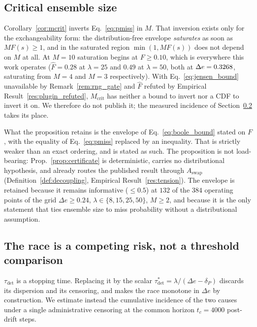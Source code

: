 \subsection{Critical ensemble size}\label{sec:dep_mcrit}

\begin{remark}\label{rem:mcrit_withdrawn}
  Corollary~\ref{cor:mcrit} inverts Eq.~\eqref{eq:pmiss} in $M$. That inversion exists only for the
  exchangeability form: the distribution-free envelope \emph{saturates} as soon as $M F(s) \ge 1$,
  and in the saturated region $\min(1, M F(s))$ does not depend on $M$ at all. At $M = 10$
  saturation begins at $F \ge 0.10$, which is everywhere this work operates
  ($\widehat{F} = 0.28$ at $\lambda = 25$ and $0.49$ at $\lambda = 50$, both at
  $\Delta e = 0.3268$, saturating from $M = 4$ and $M = 3$ respectively). With
  Eq.~\eqref{eq:jensen_bound} unavailable by Remark~\ref{rem:rng_gate} and $\widehat{F}$ refuted by
  Empirical Result~\ref{res:plugin_refuted}, $M_{\mathrm{crit}}$ has neither a bound to invert nor a
  CDF to invert it on. We therefore do not publish it; the measured incidence of Section~\ref{sec:dep_race} takes its place.
\end{remark}

What the proposition retains is the envelope of Eq.~\eqref{eq:boole_bound} stated on $F$, with the
equality of Eq.~\eqref{eq:pmiss} replaced by an inequality. That is strictly weaker than an exact ordering, and is stated as such. The proposition is not load-bearing: $\mathrm{Prop.}$~\ref{prop:certificate} is deterministic, carries no distributional hypothesis, and already routes the published result through $A_{\mathrm{swap}}$ (Definition~\ref{def:decoupling}, Empirical Result~\ref{res:tension}). The envelope is retained because it remains informative
($\le 0.5$) at $132$ of the $384$ operating points of the grid $\Delta e \ge 0.24$,
$\lambda \in \{8, 15, 25, 50\}$, $M \ge 2$, and because it is the only statement that ties ensemble
size to miss probability without a distributional assumption.

\subsection{The race is a competing risk, not a threshold comparison}\label{sec:dep_race}

$\tau_{\mathrm{det}}$ is a stopping time. Replacing it by the scalar
$\tau_{\mathrm{det}}^* = \lambda/(\Delta e - \delta_P)$ discards its dispersion and its censoring,
and makes the race monotone in $\Delta e$ by construction. We estimate instead the cumulative
incidence of the two causes under a single administrative censoring at the common horizon
$t_c = 4000$ post-drift steps.

